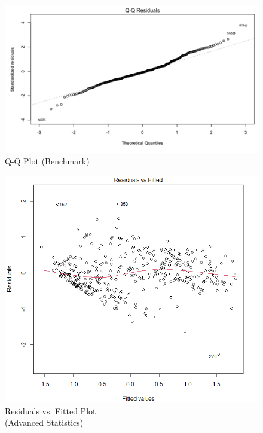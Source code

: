 \documentclass[10pt]{article}
\begin{document}
{{{{\begin{figure}[tph]
\centering
	\includegraphics[width=0.9\columnwidth]{benchmark_qq}
	\caption[]
    	{Q-Q Plot (Benchmark)\endtabular}
	\label{benchmark-qq}
\end{figure}

\begin{figure}[tph]
\centering
	\includegraphics[width=0.9\columnwidth]{model_ols_adv_resid_vs_fitted_sq_adj}
	\caption[]
    	{Residuals vs. Fitted Plot \\(Advanced Statistics)\endtabular}
	\label{advanced-residuals}
\end{figure}

}}}}
\end{document}
